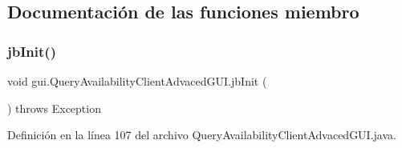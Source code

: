\subsection{Documentación de las funciones miembro}
\mbox{\label{classgui_1_1_query_availability_client_advaced_g_u_i_ab3f117543db7303b67599eee5b8cfa4e}} 
\subsubsection{\texorpdfstring{jbInit()}{jbInit()}}
{\footnotesize\ttfamily void gui.\+Query\+Availability\+Client\+Advaced\+G\+U\+I.\+jb\+Init (\begin{DoxyParamCaption}{ }\end{DoxyParamCaption}) throws Exception\hspace{0.3cm}{\ttfamily [private]}}



Definición en la línea 107 del archivo Query\+Availability\+Client\+Advaced\+G\+U\+I.\+java.


